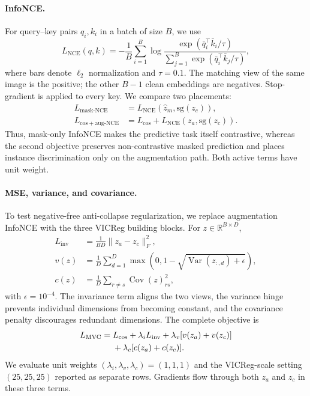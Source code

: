 \documentclass[11pt,twocolumn]{article}
\newcommand{\sg}{\mathrm{sg}}
\begin{document}
\paragraph{InfoNCE.}
For query--key pairs $q_i,k_i$ in a batch of size $B$, we use
\begin{equation}
 L_{\mathrm{NCE}}(q,k)=-\frac{1}{B}\sum_{i=1}^{B}\log
 \frac{\exp(\bar q_i^\top\bar k_i/\tau)}
 {\sum_{j=1}^{B}\exp(\bar q_i^\top\bar k_j/\tau)},
 \label{eq:nce}
\end{equation}
where bars denote $\ell_2$ normalization and $\tau=0.1$. The matching view of
the same image is the positive; the other $B-1$ clean embeddings are
negatives. Stop-gradient is applied to every key. We compare two placements:
\begin{align}
 L_{\mathrm{mask\text{-}NCE}}
   &=L_{\mathrm{NCE}}(\hat z_m,\sg(z_c)), \\
 L_{\mathrm{cos+aug\text{-}NCE}}
   &=L_{\mathrm{cos}}+L_{\mathrm{NCE}}(z_a,\sg(z_c)).
 \label{eq:placements}
\end{align}
Thus, mask-only InfoNCE makes the predictive task itself contrastive, whereas
the second objective preserves non-contrastive masked prediction and places
instance discrimination only on the augmentation path. Both active terms have
unit weight.

\paragraph{MSE, variance, and covariance.}
To test negative-free anti-collapse regularization, we replace augmentation
InfoNCE with the three VICReg building blocks. For $z\in\mathbb{R}^{B\times D}$,
\begin{align}
 L_{\mathrm{inv}}&=\frac{1}{BD}\|z_a-z_c\|_F^2,\\
 v(z)&=\frac{1}{D}\sum_{d=1}^{D}
 \max\!\left(0,1-\sqrt{\operatorname{Var}(z_{:,d})+\epsilon}\right),\\
 c(z)&=\frac{1}{D}\sum_{r\ne s}\operatorname{Cov}(z)_{rs}^{2},
 \label{eq:vicreg-components}
\end{align}
with $\epsilon=10^{-4}$. The invariance term aligns the two views, the variance
hinge prevents individual dimensions from becoming constant, and the
covariance penalty discourages redundant dimensions. The complete objective is
\begin{align}
 L_{\mathrm{MVC}}={}&L_{\mathrm{cos}}+\lambda_iL_{\mathrm{inv}}
 +\lambda_v[v(z_a)+v(z_c)] \notag\\
 &+\lambda_c[c(z_a)+c(z_c)].
 \label{eq:mvc}
\end{align}
We evaluate unit weights $(\lambda_i,\lambda_v,\lambda_c)=(1,1,1)$ and the
VICReg-scale setting $(25,25,25)$ reported as separate rows. Gradients flow
through both $z_a$ and $z_c$ in these three terms.
\end{document}
